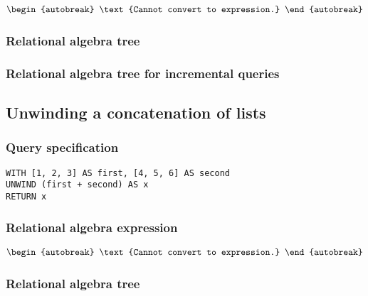 \begin{align*}
\begin{autobreak}
\text{Cannot convert to expression.}
\end{autobreak}
\end{align*}

\subsubsection*{Relational algebra tree}


\subsubsection*{Relational algebra tree for incremental queries}


\subsection{Unwinding a concatenation of lists}

\subsubsection*{Query specification}

\begin{lstlisting}
WITH [1, 2, 3] AS first, [4, 5, 6] AS second
UNWIND (first + second) AS x
RETURN x
\end{lstlisting}

\subsubsection*{Relational algebra expression}

\begin{align*}
\begin{autobreak}
\text{Cannot convert to expression.}
\end{autobreak}
\end{align*}

\subsubsection*{Relational algebra tree}


